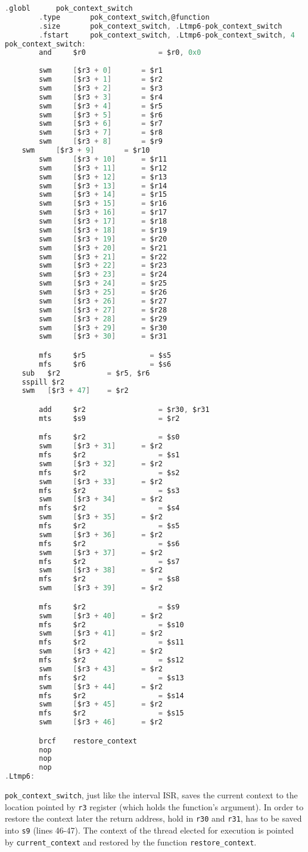 \begin{lstlisting}[language=C, caption=Function \texttt{context\_switch}: saves the context to the location pointed by \texttt{r3}, label=lst:context_switch]
 		.globl 		pok_context_switch
		.type 		pok_context_switch,@function
		.size 		pok_context_switch, .Ltmp6-pok_context_switch
		.fstart		pok_context_switch, .Ltmp6-pok_context_switch, 4
pok_context_switch:
		and 	$r0				    = $r0, 0x0
	
		swm  	[$r3 + 0] 		= $r1
		swm  	[$r3 + 1] 		= $r2
		swm  	[$r3 + 2] 		= $r3
		swm  	[$r3 + 3] 		= $r4
		swm  	[$r3 + 4] 		= $r5
		swm  	[$r3 + 5] 		= $r6
		swm  	[$r3 + 6] 		= $r7
		swm  	[$r3 + 7] 		= $r8
		swm  	[$r3 + 8] 		= $r9
  	swm  	[$r3 + 9] 		= $r10
		swm  	[$r3 + 10] 		= $r11
		swm  	[$r3 + 11] 		= $r12
		swm  	[$r3 + 12] 		= $r13
		swm  	[$r3 + 13] 		= $r14
		swm  	[$r3 + 14] 		= $r15
		swm  	[$r3 + 15] 		= $r16
		swm  	[$r3 + 16] 		= $r17
		swm  	[$r3 + 17] 		= $r18
		swm  	[$r3 + 18] 		= $r19
		swm  	[$r3 + 19] 		= $r20
		swm  	[$r3 + 20] 		= $r21
		swm  	[$r3 + 21]		= $r22
		swm  	[$r3 + 22] 		= $r23
		swm  	[$r3 + 23] 		= $r24
		swm  	[$r3 + 24] 		= $r25
		swm  	[$r3 + 25] 		= $r26
		swm  	[$r3 + 26] 		= $r27
		swm  	[$r3 + 27] 		= $r28
		swm  	[$r3 + 28] 		= $r29
		swm  	[$r3 + 29] 		= $r30
		swm  	[$r3 + 30] 		= $r31

		mfs	 	$r5 	  		  = $s5
		mfs	 	$r6 	  		  = $s6
  	sub   $r2 	        = $r5, $r6
  	sspill $r2
  	swm   [$r3 + 47]    = $r2

		add 	$r2 			    = $r30, $r31
		mts 	$s9 			    = $r2

		mfs	 	$r2 			    = $s0
		swm  	[$r3 + 31] 		= $r2
		mfs		$r2 			    = $s1
		swm  	[$r3 + 32] 		= $r2
		mfs	 	$r2 			    = $s2
		swm  	[$r3 + 33] 		= $r2
		mfs	 	$r2 			    = $s3
		swm  	[$r3 + 34] 		= $r2
		mfs	 	$r2 			    = $s4
		swm  	[$r3 + 35] 		= $r2
		mfs	 	$r2 			    = $s5
		swm  	[$r3 + 36] 		= $r2
		mfs	 	$r2 			    = $s6
		swm  	[$r3 + 37] 		= $r2
		mfs	 	$r2 			    = $s7
		swm  	[$r3 + 38] 		= $r2
		mfs	 	$r2 			    = $s8
		swm  	[$r3 + 39] 		= $r2

		mfs	 	$r2 			    = $s9
		swm  	[$r3 + 40] 		= $r2
		mfs	 	$r2 			    = $s10
		swm  	[$r3 + 41] 		= $r2
		mfs	 	$r2 			    = $s11
		swm  	[$r3 + 42] 		= $r2
		mfs	 	$r2 			    = $s12
		swm  	[$r3 + 43] 		= $r2
		mfs	 	$r2 			    = $s13
		swm  	[$r3 + 44] 		= $r2
		mfs	 	$r2 			    = $s14
		swm  	[$r3 + 45] 		= $r2
		mfs	 	$r2 			    = $s15
		swm  	[$r3 + 46] 		= $r2

		brcf 	restore_context
		nop
		nop
		nop
.Ltmp6:
\end{lstlisting}

\texttt{pok\_context\_switch}, just like the interval ISR, saves the current context to the location pointed by \texttt{r3} register (which holds the function's argument). In order to restore the context later the return address, hold in \texttt{r30} and \texttt{r31}, has to be saved into \texttt{s9} (lines 46-47). The context of the thread elected for execution is pointed by \texttt{current\_context} and restored by the function \texttt{restore\_context}.
